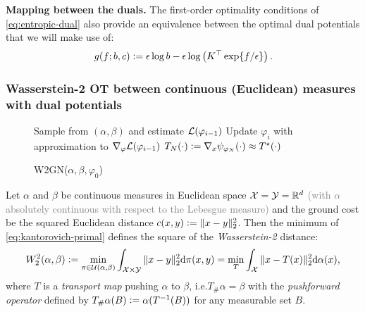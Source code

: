 \documentclass{article}
\newcommand{\ie}{i.e.\xspace}
\newcommand{\defeq}{\vcentcolon=}
\begin{document}
\textbf{Mapping between the duals.}
The first-order optimality conditions of \cref{eq:entropic-dual}
also provide an equivalence between the optimal dual potentials
that we will make use of:
\begin{equation}
  g(f; b, c) \defeq \epsilon \log b - \epsilon\log\left(
    K^\top \exp\{f/\epsilon\}\right).
  \label{eq:f-to-g}
\end{equation}


\subsubsection{Wasserstein-2 OT between continuous (Euclidean) measures with dual potentials}
\label{sec:prelim:continuous}
\begin{figure}
  \vspace{-10mm}
  \begin{minipage}{0.48\textwidth}
    \begin{algorithm}[H]
      \caption{\footnotesize W2GN($\alpha, \beta, \varphi_0$)}
      \begin{algorithmic}
        \footnotesize
        \State Sample from $(\alpha,\beta)$ and estimate ${\mathcal{L}}(\varphi_{i-1})$
        \State Update $\varphi_i$ with approximation to $\nabla_\varphi {\mathcal{L}}(\varphi_{i-1})$
        \EndFor
        \State \Return $T_N(\cdot)\defeq\nabla_x \psi_{\varphi_N}(\cdot) \approx T^\star(\cdot)$
      \end{algorithmic}
      \label{alg:w2gn}
    \end{algorithm}
  \end{minipage}
  \vspace{-6mm}
\end{figure}

Let $\alpha$ and $\beta$ be continuous measures in Euclidean
space ${\mathcal{X}}={\mathcal{Y}}=\mathbb{R}^d$ \textcolor{gray}{(with $\alpha$ absolutely continuous
with respect to the Lebesgue measure)} and the ground cost be
the squared Euclidean distance
$c(x,y)\defeq\|x-y\|_2^2$.
Then the minimum of \cref{eq:kantorovich-primal} defines
the square of the \emph{Wasserstein-2} distance:
\begin{equation}
  W_2^2(\alpha,\beta) \defeq \min_{\pi\in\gU(\alpha, \beta)}
    \int_{\gX\times \gY} \|x-y\|_2^2{\rm d}\pi(x,y)
    =
    \min_{T}\int_\gX \|x-T(x)\|_2^2{\rm d}\alpha(x),
  \label{eq:W2}
\end{equation}
where $T$ is a \emph{transport map} pushing
$\alpha$ to $\beta$, \ie $T_{\#}\alpha=\beta$
with the \emph{pushforward operator}
defined by $T_{\#}\alpha(B) \defeq \alpha(T^{-1}(B))$
for any measurable set $B$.
\end{document}
